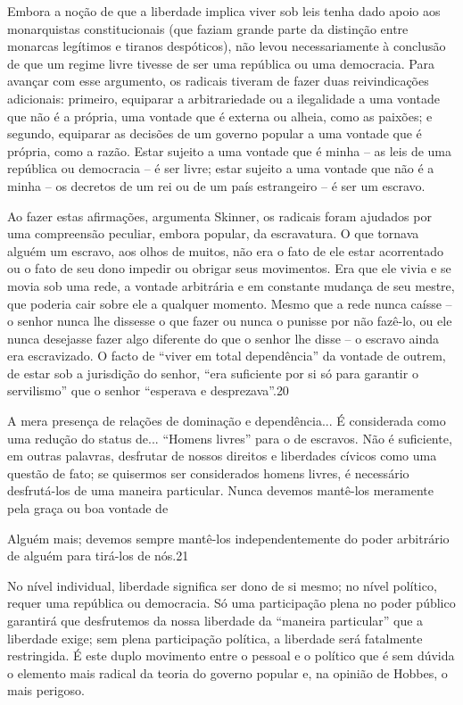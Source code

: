 Embora a noção de que a liberdade implica viver sob leis tenha dado apoio aos monarquistas constitucionais (que faziam grande parte da distinção entre monarcas legítimos e tiranos despóticos), não levou necessariamente à conclusão de que um regime livre tivesse de ser uma república ou uma democracia. Para avançar com esse argumento, os radicais tiveram de fazer duas reivindicações adicionais: primeiro, equiparar a arbitrariedade ou a ilegalidade a uma vontade que não é a própria, uma vontade que é externa ou alheia, como as paixões; e segundo, equiparar as decisões de um governo popular a uma vontade que é própria, como a razão. Estar sujeito a uma vontade que é minha – as leis de uma república ou democracia – é ser livre; estar sujeito a uma vontade que não é a minha – os decretos de um rei ou de um país estrangeiro – é ser um escravo.
 \par 
Ao fazer estas afirmações, argumenta Skinner, os radicais foram ajudados por uma compreensão peculiar, embora popular, da escravatura. O que tornava alguém um escravo, aos olhos de muitos, não era o fato de ele estar acorrentado ou o fato de seu dono impedir ou obrigar seus movimentos. Era que ele vivia e se movia sob uma rede, a vontade arbitrária e em constante mudança de seu mestre, que poderia cair sobre ele a qualquer momento. Mesmo que a rede nunca caísse – o senhor nunca lhe dissesse o que fazer ou nunca o punisse por não fazê-lo, ou ele nunca desejasse fazer algo diferente do que o senhor lhe disse – o escravo ainda era escravizado. O facto de “viver em total dependência” da vontade de outrem, de estar sob a jurisdição do senhor, “era suficiente por si só para garantir o servilismo” que o senhor “esperava e desprezava”.{\color{blue}20}
 \par 
A mera presença de relações de dominação e dependência... É considerada como uma redução do status de... “Homens livres” para o de escravos. Não é suficiente, em outras palavras, desfrutar de nossos direitos e liberdades cívicos como uma questão de fato; se quisermos ser considerados homens livres, é necessário desfrutá-los de uma maneira particular. Nunca devemos mantê-los meramente pela graça ou boa vontade de
 \par 
Alguém mais; devemos sempre mantê-los independentemente do poder arbitrário de alguém para tirá-los de nós.{\color{blue}21}
 \par 
No nível individual, liberdade significa ser dono de si mesmo; no nível político, requer uma república ou democracia. Só uma participação plena no poder público garantirá que desfrutemos da nossa liberdade da “maneira particular” que a liberdade exige; sem plena participação política, a liberdade será fatalmente restringida. É este duplo movimento entre o pessoal e o político que é sem dúvida o elemento mais radical da teoria do governo popular e, na opinião de Hobbes, o mais perigoso.
